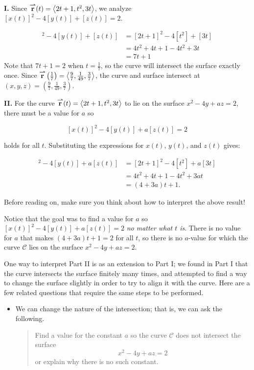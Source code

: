 \documentclass[noauthor, handout]{ximera}
\begin{document}
\begin{problem}
\begin{freeResponse}
\textbf{I.} Since ${\overset{\boldsymbol{\rightharpoonup}}{\mathbf{r}}} (t) = \left\langle 2t+1, t^2, 3t\right\rangle$, we analyze $[x(t)]^2-4[y(t)] + [z(t)] = 2.$

\begin{align*}
[x(t)]^2-4[y(t)] + [z(t)] & = [2t+1]^2-4[t^2] + [3t] \\
&= 4t^2+4t+1 -4t^2+3t \\
& = 7t+1
\end{align*}
Note that $7t+1 = 2$ when $t= \frac{1}{7}$, so the curve will intersect the surface exactly once.  Since ${\overset{\boldsymbol{\rightharpoonup}}{\mathbf{r}}}\left(\frac{1}{7}\right) = \left\langle \frac{9}{7},\frac{1}{49},\frac{3}{7}\right\rangle$, the curve and surface intersect at $(x,y,z) = \left(\frac{9}{7},\frac{1}{49},\frac{3}{7}\right)$.

\textbf{II.} For the curve ${\overset{\boldsymbol{\rightharpoonup}}{\mathbf{r}}} (t) = \left\langle 2t+1, t^2, 3t\right\rangle$ to lie on the surface $x^2-4y + az = 2$, there must be a value for $a$ so 

\[
[x(t)]^2-4[y(t)] + a[z(t)] = 2
\]

holds for all $t$.  Substituting the expressions for $x(t)$, $y(t)$, and $z(t)$ gives:

\begin{align*}
[x(t)]^2-4[y(t)] + a [z(t)] & = [2t+1]^2-4[t^2] + a[3t] \\
&= 4t^2+4t+1 -4t^2+3at \\
& = (4+3a)t+1.
\end{align*}

Before reading on, make sure you think about how to interpret the above result!

Notice that the goal was to find a value for $a$ so $[x(t)]^2-4[y(t)] + a[z(t)] = 2$ \emph{no matter what $t$ is}.  There is no value for $a$ that makes $(4+3a)t+1=2$ for all $t$, so there is no $a$-value for which the curve $\mathcal{C}$ lies on the surface $x^2-4y + az = 2$.

\begin{remark}
One way to interpret Part II is as an extension to Part I; we found in Part I that the curve intersects the surface finitely many times, and attempted to find a way to change the surface slightly in order to try to align it with the curve.  Here are a few related questions that require the same steps to be performed.

\begin{itemize}
\item We can change the nature of the intersection; that is, we can ask the following.

\begin{quote}
Find a value for the constant $a$ so the curve $\mathcal{C}$ does not intersect the surface $$x^2-4y + az = 2$$ or explain why there is no such constant. 
\end{quote}


\end{itemize}
\end{remark}
\end{freeResponse}
\end{problem}
\end{document}
